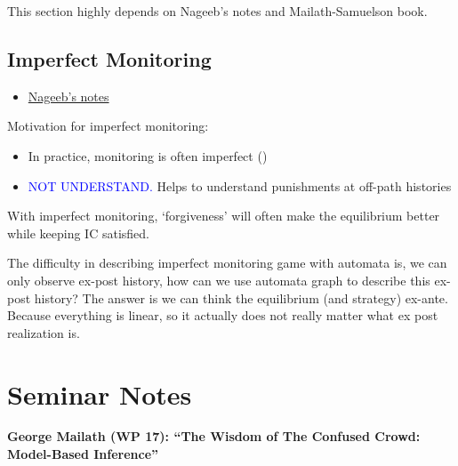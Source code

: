 \documentclass{book}
\theoremstyle{plain}
\theoremstyle{definition}
\begin{document}
This section highly depends on Nageeb's notes and Mailath-Samuelson book.

\subsection{Imperfect Monitoring} %
\label{sub:imperfect_monitoring}

\begin{itemize}
	\item \href{run:resources/repeated_game/imperfect_monitoring_najeeb.pdf}{Nageeb's notes}
\end{itemize}

Motivation for imperfect monitoring:
\begin{itemize}
	\item In practice, monitoring is often imperfect (\cite{Green_Porter:1984EMCA})
	\item \textcolor{blue}{NOT UNDERSTAND.} Helps to understand punishments at off-path histories
\end{itemize}

With imperfect monitoring, `forgiveness' will often make the equilibrium better while keeping IC satisfied.

The difficulty in describing imperfect monitoring game with automata is, we can only observe ex-post history, 
how can we use automata graph to describe this ex-post history?
The answer is we can think the equilibrium (and strategy) ex-ante. 
Because everything is linear, so it actually does not really matter what ex post realization is.







\section{Seminar Notes} %
\label{sec:seminar_notes}

\noindent
\textbf{George Mailath (WP 17): “The Wisdom of The Confused Crowd: Model-Based Inference”}\\
\end{document}
